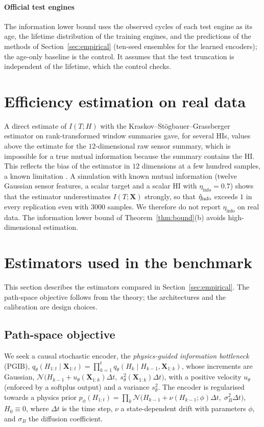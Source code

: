 \documentclass[preprint,12pt]{elsarticle}
\theoremstyle{definition}
\newcommand{\etaPIE}{\eta_{\mathrm{info}}}
\begin{document}
\paragraph{Official test engines} The information lower bound uses the observed cycles of each test engine as its age, the lifetime distribution of the training engines, and the predictions of the methods of Section~\ref{sec:empirical} (ten-seed ensembles for the learned encoders); the age-only baseline is the control. It assumes that the test truncation is independent of the lifetime, which the control checks.

\section{Efficiency estimation on real data}
\label{app:p1}
A direct estimate of $I(T;H)$ with the Kraskov--St\"ogbauer--Grassberger estimator \cite{kraskov2004} on rank-transformed window summaries gave, for several HIs, values above the estimate for the $12$-dimensional raw sensor summary, which is impossible for a true mutual information because the summary contains the HI. This reflects the bias of the estimator in $12$ dimensions at a few hundred samples, a known limitation \cite{paninski2003,mcallester2020}. A simulation with known mutual information (twelve Gaussian sensor features, a scalar target and a scalar HI with $\etaPIE=0.7$) shows that the estimator underestimates $I(T;\mathbf X)$ strongly, so that $\hat\eta_{\rm info}$ exceeds $1$ in every replication even with $3000$ samples. We therefore do not report $\etaPIE$ on real data. The information lower bound of Theorem~\ref{thm:bound}(b) avoids high-dimensional estimation.

\section{Estimators used in the benchmark}
\label{sec:pgib}
This section describes the estimators compared in Section~\ref{sec:empirical}. The path-space objective follows from the theory; the architectures and the calibration are design choices.

\subsection{Path-space objective}
We seek a causal stochastic encoder, the \emph{physics-guided information bottleneck} (PGIB), $q_\theta(H_{1:t}\mid\mathbf{X}_{1:t})=\prod_{k=1}^{t}q_\theta(H_k\mid H_{k-1},\mathbf{X}_{1:k})$, whose increments are Gaussian, $\mathcal N\big(H_{k-1}+u_\theta(\mathbf{X}_{1:k})\Delta t,\;s_\theta^2(\mathbf{X}_{1:k})\Delta t\big)$, with a positive velocity $u_\theta$ (enforced by a softplus output) and a variance $s_\theta^2$. The encoder is regularised towards a physics prior $p_\phi(H_{1:t})=\prod_k\mathcal N\big(H_{k-1}+\nu(H_{k-1};\phi)\Delta t,\;\sigma_B^2\Delta t\big)$, $H_0\equiv0$, where $\Delta t$ is the time step, $\nu$ a state-dependent drift with parameters $\phi$, and $\sigma_B$ the diffusion coefficient.
\end{document}
